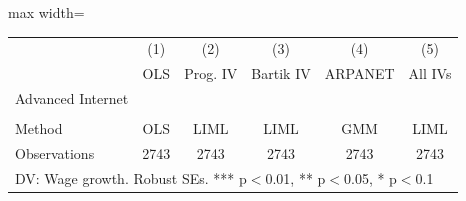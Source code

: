 \begin{adjustbox}{max width=\textwidth}
\begin{tabular}{lccccc}
\toprule
 & (1) & (2) & (3) & (4) & (5) \\
 & OLS & Prog. IV & Bartik IV & ARPANET & All IVs \\
\midrule
Advanced Internet &  &  &  &  &  \\
 &  &  &  &  &  \\[0.3em]
\midrule
Method & OLS & LIML & LIML & GMM & LIML \\
Observations & 2743 & 2743 & 2743 & 2743 & 2743 \\
\bottomrule
\multicolumn{6}{l}{\footnotesize DV: Wage growth. Robust SEs. *** p$<$0.01, ** p$<$0.05, * p$<$0.1} \\
\end{tabular}
\end{adjustbox}
